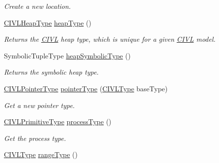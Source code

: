 \begin{DoxyCompactItemize}
\begin{DoxyCompactList}\small\item\em Create a new location. \end{DoxyCompactList}\item 
\hyperlink{interfaceedu_1_1udel_1_1cis_1_1vsl_1_1civl_1_1model_1_1IF_1_1type_1_1CIVLHeapType}{C\+I\+V\+L\+Heap\+Type} \hyperlink{interfaceedu_1_1udel_1_1cis_1_1vsl_1_1civl_1_1model_1_1IF_1_1CIVLTypeFactory_ad385b5ace8c88cc64c1e79d6604e83da}{heap\+Type} ()
\begin{DoxyCompactList}\small\item\em Returns the \hyperlink{classedu_1_1udel_1_1cis_1_1vsl_1_1civl_1_1CIVL}{C\+I\+V\+L} heap type, which is unique for a given \hyperlink{classedu_1_1udel_1_1cis_1_1vsl_1_1civl_1_1CIVL}{C\+I\+V\+L} model. \end{DoxyCompactList}\item 
Symbolic\+Tuple\+Type \hyperlink{interfaceedu_1_1udel_1_1cis_1_1vsl_1_1civl_1_1model_1_1IF_1_1CIVLTypeFactory_ab9d7f6737838402514c0dca3ca8a9c0c}{heap\+Symbolic\+Type} ()
\begin{DoxyCompactList}\small\item\em Returns the symbolic heap type. \end{DoxyCompactList}\item 
\hyperlink{interfaceedu_1_1udel_1_1cis_1_1vsl_1_1civl_1_1model_1_1IF_1_1type_1_1CIVLPointerType}{C\+I\+V\+L\+Pointer\+Type} \hyperlink{interfaceedu_1_1udel_1_1cis_1_1vsl_1_1civl_1_1model_1_1IF_1_1CIVLTypeFactory_abd638d688c7f810bddf3f822de0a4b11}{pointer\+Type} (\hyperlink{interfaceedu_1_1udel_1_1cis_1_1vsl_1_1civl_1_1model_1_1IF_1_1type_1_1CIVLType}{C\+I\+V\+L\+Type} base\+Type)
\begin{DoxyCompactList}\small\item\em Get a new pointer type. \end{DoxyCompactList}\item 
\hyperlink{interfaceedu_1_1udel_1_1cis_1_1vsl_1_1civl_1_1model_1_1IF_1_1type_1_1CIVLPrimitiveType}{C\+I\+V\+L\+Primitive\+Type} \hyperlink{interfaceedu_1_1udel_1_1cis_1_1vsl_1_1civl_1_1model_1_1IF_1_1CIVLTypeFactory_a71d99fd4f10982591830075621a39dad}{process\+Type} ()
\begin{DoxyCompactList}\small\item\em Get the process type. \end{DoxyCompactList}\item 
\hyperlink{interfaceedu_1_1udel_1_1cis_1_1vsl_1_1civl_1_1model_1_1IF_1_1type_1_1CIVLType}{C\+I\+V\+L\+Type} \hyperlink{interfaceedu_1_1udel_1_1cis_1_1vsl_1_1civl_1_1model_1_1IF_1_1CIVLTypeFactory_ac9066abf4714e7acbfae8c30f2cdcd71}{range\+Type} ()

\end{DoxyCompactItemize}
